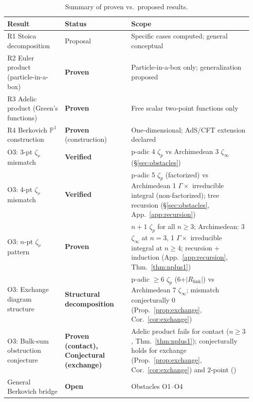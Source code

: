 \documentclass[11pt,a4paper]{article}
\newcommand{\Pone}{\mathbb{P}^1}
\begin{document}
\begin{table}[H]
\centering
\caption{Summary of proven vs.\ proposed results.}
\label{tab:summary}
\begin{tabular}{lll}
\toprule
Result & Status & Scope \\
\midrule
R1 Stoica decomposition & Proposal & Specific cases computed; general conceptual \\
R2 Euler product (particle-in-a-box) & \textbf{Proven} & Particle-in-a-box only; generalization proposed \\
R3 Adelic product (Green's functions) & \textbf{Proven} & Free scalar two-point functions only \\
R4 Berkovich $\Pone$ construction & \textbf{Proven} (construction) & One-dimensional; AdS/CFT extension declared \\
O3: 3-pt $\zeta_\nu$ mismatch & \textbf{Verified} & p-adic 4 $\zeta_p$ vs Archimedean 3 $\zeta_\infty$ (\S\ref{sec:obstacles}) \\
O3: 4-pt $\zeta_\nu$ mismatch & \textbf{Verified} & p-adic 5 $\zeta_p$ (factorized) vs Archimedean 1 $\Gamma \times$ irreducible integral (non-factorized); tree recursion (\S\ref{sec:obstacles}, App.~\ref{app:recursion}) \\
O3: $n$-pt $\zeta_\nu$ pattern & \textbf{Proven} & $n{+}1$ $\zeta_p$ for all $n \geq 3$; Archimedean: 3 $\zeta_\infty$ at $n=3$, 1 $\Gamma \times$ irreducible integral at $n \geq 4$; recursion + induction (App.~\ref{app:recursion}, Thm.~\ref{thm:nplus1}) \\
O3: Exchange diagram structure & \textbf{Structural decomposition} & p-adic $\geq 6$ $\zeta_p$ (6+$|R_{\mathrm{link}}|$) vs Archimedean 7 $\zeta_\infty$; mismatch conjecturally 0 (Prop.~\ref{prop:exchange}, Cor.~\ref{cor:exchange}) \\
O3: Bulk-sum obstruction conjecture & \textbf{Proven (contact), Conjectural (exchange)} & Adelic product fails for contact ($n \geq 3$, Thm.~\ref{thm:nplus1}); conjecturally holds for exchange (Prop.~\ref{prop:exchange}, Cor.~\ref{cor:exchange}) and 2-point (\cite{HSYZ20}) \\
General Berkovich bridge & \textbf{Open} & Obstacles O1--O4 \\
\bottomrule
\end{tabular}
\end{table}

\end{document}
